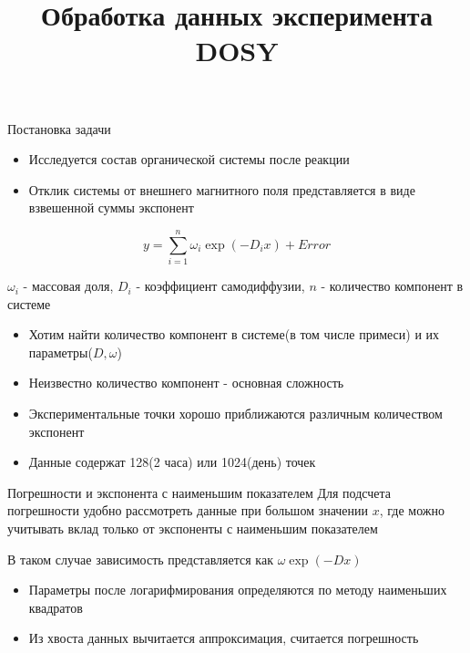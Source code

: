 \documentclass{beamer}      %
\title[Анализ данных в эксперименте DOSY]{Обработка данных эксперимента DOSY}
\subtitle{}
\institute[]{Задача предложена лабораторией ЯМР МФТИ, 125 НК}
\date{}
\begin{document}
\begin{frame}
	\titlepage
\end{frame}



\begin{frame}[fragile]{Постановка задачи}

    \begin{itemize}
        \item Исследуется состав органической системы после реакции
        \item Отклик системы от внешнего магнитного поля представляется в виде взвешенной суммы экспонент
    \end{itemize}

    \begin{equation}
        y = \sum_{i=1}^n \omega_i \exp(-D_i x) + Error
    \end{equation}

    $\omega_i$ - массовая доля,
    $D_i$ - коэффициент самодиффузии,
    $n$ - количество компонент в системе

\end{frame}


\begin{frame}[fragile]{}
    \begin{itemize}
        \item Хотим найти количество компонент в системе(в том числе примеси) и их параметры($D, \omega$)
        \item Неизвестно количество компонент - основная сложность
        \item Экспериментальные точки хорошо приближаются различным количеством экспонент
        \item Данные содержат 128(2 часа) или 1024(день) точек
    \end{itemize}
\end{frame}



\begin{frame}[fragile]{Погрешности и экспонента с наименьшим показателем}
    Для подсчета погрешности удобно рассмотреть данные при большом
    значении $x$, где можно учитывать вклад только от экспоненты с наименьшим показателем

    \hspace{1pt}

    В таком случае зависимость представляется как $\omega \exp(-Dx)$
    \begin{itemize}
        \item Параметры после логарифмирования определяются по методу наименьших квадратов
        \item Из хвоста данных вычитается аппроксимация, считается погрешность
    \end{itemize}
\end{frame}
\end{document}
